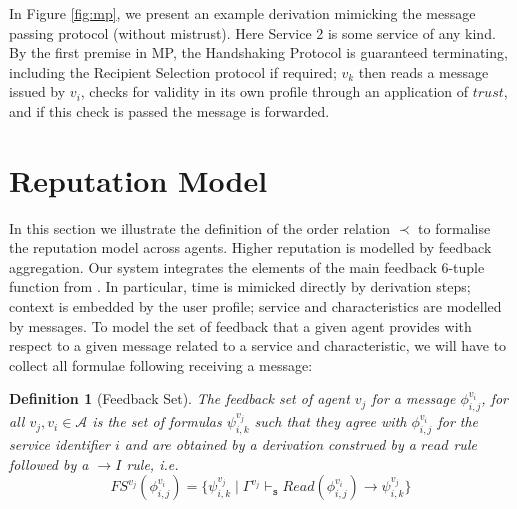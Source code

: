 \documentclass[compsoc, conference, letterpaper, 10pt, times]{IEEEtran}
\newtheorem{definition}{Definition}
\begin{document}
In Figure \ref{fig:mp}, we present an example derivation mimicking the message passing protocol (without mistrust). Here Service 2 is some service of any kind. By the first premise in MP, the Handshaking Protocol is guaranteed terminating, including the Recipient Selection protocol if required; $v_{k}$ then reads a message issued by $v_{i}$, checks for validity in its own profile through an application of $trust$, and if this check is passed the message is forwarded.



\begin{figure*}
	\begin{prooftree}
		\end{prooftree}

	\caption{The Message Passing Protocol}\label{fig:mp}
\end{figure*}




\section{Reputation Model}\label{sec:reputation}

In this section we illustrate the definition of the order relation $\prec$ to formalise the reputation model across agents. Higher reputation is modelled by feedback aggregation. Our system integrates the elements of the main feedback 6-tuple function from \cite{glenford}. In particular, time is mimicked directly by derivation steps; context is embedded by the user profile; service and characteristics are modelled by messages. To model the set of feedback that a given agent provides with respect to a given message related to a service and characteristic, we will have to collect all formulae following receiving a message:

\begin{definition}[Feedback Set]
The feedback set of agent $v_{j}$ for a message $\phi^{v_{i}}_{i,j}$, for all $v_{j}, v_{i} \in \mathcal{A}$ is the set of formulas $\psi^{v_{j}}_{i,k}$ such that they agree with $\phi^{v_{i}}_{i,j}$ for the service identifier $i$ and are obtained by a derivation construed by a $read$ rule followed by a $\rightarrow I$ rule, i.e.
%
\[
FS^{v_{j}}(\phi^{v_{i}}_{i,j})=\{ \psi^{v_{j}}_{i,k}\mid \Gamma^{v_{j}}
\vdash_{\mathtt{s}}  Read(\phi^{v_{i}}_{i,j})\rightarrow \psi^{v_{j}}_{i,k}  \}
\]
\end{definition}
\end{document}
